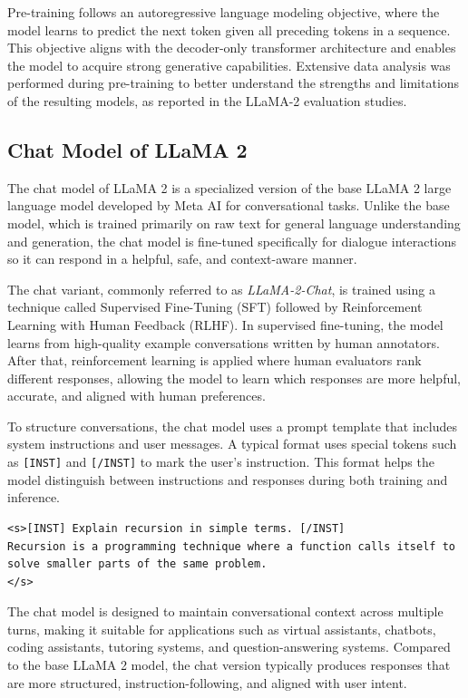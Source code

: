 Pre-training follows an autoregressive language modeling objective, where the
model learns to predict the next token given all preceding tokens in a sequence.
This objective aligns with the decoder-only transformer architecture and enables
the model to acquire strong generative capabilities. Extensive data analysis was
performed during pre-training to better understand the strengths and
limitations of the resulting models, as reported in the LLaMA-2 evaluation
studies.

\subsection{Chat Model of LLaMA 2}

The chat model of LLaMA 2 is a specialized version of the base LLaMA 2 large language model developed by Meta AI for conversational tasks. Unlike the base model, which is trained primarily on raw text for general language understanding and generation, the chat model is fine-tuned specifically for dialogue interactions so it can respond in a helpful, safe, and context-aware manner.

The chat variant, commonly referred to as \textit{LLaMA-2-Chat}, is trained using a technique called Supervised Fine-Tuning (SFT) followed by Reinforcement Learning with Human Feedback (RLHF). In supervised fine-tuning, the model learns from high-quality example conversations written by human annotators. After that, reinforcement learning is applied where human evaluators rank different responses, allowing the model to learn which responses are more helpful, accurate, and aligned with human preferences.

To structure conversations, the chat model uses a prompt template that includes system instructions and user messages. A typical format uses special tokens such as \texttt{[INST]} and \texttt{[/INST]} to mark the user's instruction. This format helps the model distinguish between instructions and responses during both training and inference.

\begin{Verbatim}[breaklines=true, breakanywhere=true, fontsize=\small]
<s>[INST] Explain recursion in simple terms. [/INST]
Recursion is a programming technique where a function calls itself to solve smaller parts of the same problem.
</s>
\end{Verbatim}

The chat model is designed to maintain conversational context across multiple turns, making it suitable for applications such as virtual assistants, chatbots, coding assistants, tutoring systems, and question-answering systems. Compared to the base LLaMA 2 model, the chat version typically produces responses that are more structured, instruction-following, and aligned with user intent.

